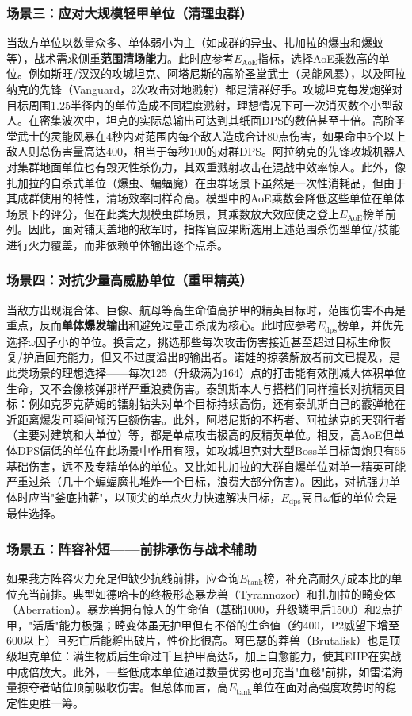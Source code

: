 \documentclass[a4paper,12pt]{article}
\begin{document}
\begin{CJK}{UTF8}{gbsn}
\subsubsection{场景三：应对大规模轻甲单位（清理虫群）}
当敌方单位以数量众多、单体弱小为主（如成群的异虫、扎加拉的爆虫和爆蚊等），战术需求侧重\textbf{范围清场能力}。此时应参考$E_{\text{AoE}}$指标，选择AoE乘数高的单位。例如斯旺/汉汉的攻城坦克、阿塔尼斯的高阶圣堂武士（灵能风暴），以及阿拉纳克的先锋（Vanguard，2次攻击对地溅射）都是清群好手。攻城坦克每发炮弹对目标周围1.25半径内的单位造成不同程度溅射，理想情况下可一次消灭数个小型敌人。在密集波次中，坦克的实际总输出可达到其纸面DPS的数倍甚至十倍。高阶圣堂武士的灵能风暴在4秒内对范围内每个敌人造成合计80点伤害，如果命中5个以上敌人则总伤害量高达400，相当于每秒100的对群DPS。阿拉纳克的先锋攻城机器人对集群地面单位也有毁灭性杀伤力，其双重溅射攻击在混战中效率惊人。此外，像扎加拉的自杀式单位（爆虫、蝙蝠魔）在虫群场景下虽然是一次性消耗品，但由于其成群使用的特性，清场效率同样奇高。模型中的AoE乘数会降低这些单位在单体场景下的评分，但在此类大规模虫群场景，其乘数放大效应使之登上$E_{\text{AoE}}$榜单前列。因此，面对铺天盖地的敌军时，指挥官应果断选用上述范围杀伤型单位/技能进行火力覆盖，而非依赖单体输出逐个点杀。

\subsubsection{场景四：对抗少量高威胁单位（重甲精英）}
当敌方出现混合体、巨像、航母等高生命值高护甲的精英目标时，范围伤害不再是重点，反而\textbf{单体爆发输出}和避免过量击杀成为核心。此时应参考$E_{\text{dps}}$榜单，并优先选择$\omega$因子小的单位。换言之，挑选那些每次攻击伤害接近甚至超过目标生命恢复/护盾回充能力，但又不过度溢出的输出者。诺娃的掠袭解放者前文已提及，是此类场景的理想选择——每次125（升级满为164）点的打击能有效削减大体积单位生命，又不会像核弹那样严重浪费伤害。泰凯斯本人与搭档们同样擅长对抗精英目标：例如克罗克萨姆的镭射钻头对单个目标持续高伤，还有泰凯斯自己的霰弹枪在近距离爆发可瞬间倾泻巨额伤害。此外，阿塔尼斯的不朽者、阿拉纳克的天罚行者（主要对建筑和大单位）等，都是单点攻击极高的反精英单位。相反，高AoE但单体DPS偏低的单位在此场景中作用有限，如攻城坦克对大型Boss单目标每炮只有55基础伤害，远不及专精单体的单位。又比如扎加拉的大群自爆单位对单一精英可能严重过杀（几十个蝙蝠魔扎堆炸一个目标，浪费大部分伤害）。因此，对抗强力单体时应当"釜底抽薪"，以顶尖的单点火力快速解决目标，$E_{\text{dps}}$高且$\omega$低的单位会是最佳选择。

\subsubsection{场景五：阵容补短——前排承伤与战术辅助}
如果我方阵容火力充足但缺少抗线前排，应查询$E_{\text{tank}}$榜，补充高耐久/成本比的单位充当前排。典型如德哈卡的终极形态暴龙兽（Tyrannozor）和扎加拉的畸变体（Aberration）。暴龙兽拥有惊人的生命值（基础1000，升级鳞甲后1500）和2点护甲，"活盾"能力极强；畸变体虽无护甲但有不俗的生命值（约400，P2威望下增至600以上）且死亡后能孵出破片，性价比很高。阿巴瑟的莽兽（Brutalisk）也是顶级坦克单位：满生物质后生命过千且护甲高达5，加上自愈能力，使其EHP在实战中成倍放大。此外，一些低成本单位通过数量优势也可充当"血毯"前排，如雷诺海量掠夺者站位顶前吸收伤害。但总体而言，高$E_{\text{tank}}$单位在面对高强度攻势时的稳定性更胜一筹。


\end{CJK}
\end{document}
